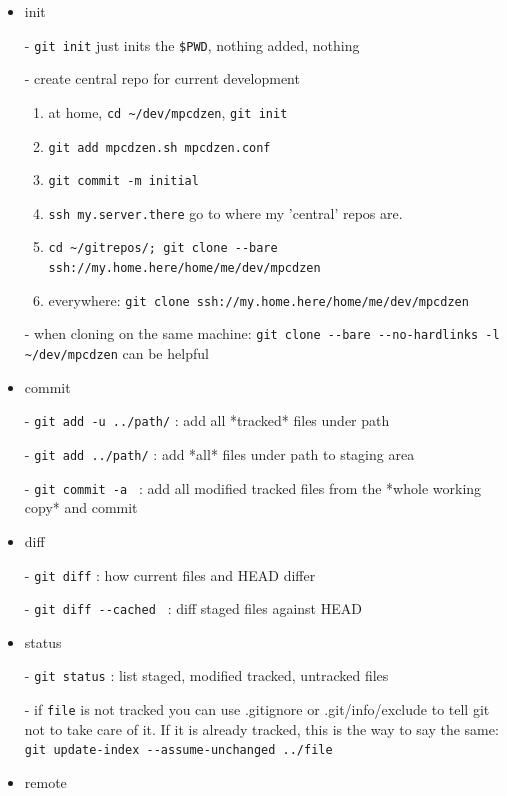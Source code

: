 \begin{itemize}


\item{init} 

- \verb`git init`  just inits the \verb`$PWD`, nothing added, nothing

- create central repo for current development\begin{enumerate}
	
	\item at home, \verb`cd ~/dev/mpcdzen`, \verb`git init`
	\item \verb`git add mpcdzen.sh mpcdzen.conf`  
	\item \verb`git commit -m initial`
	\item \verb`ssh my.server.there` go to where my 'central' repos are.
	\item \verb`cd ~/gitrepos/; git clone --bare  ssh://my.home.here/home/me/dev/mpcdzen`
	\item everywhere: \verb`git clone ssh://my.home.here/home/me/dev/mpcdzen` \end{enumerate}

- when cloning on the same machine:
  \verb`git clone --bare --no-hardlinks -l ~/dev/mpcdzen`  can be helpful



\item{commit}

- \verb`git add -u ../path/` : add all *tracked* files under path

- \verb`git add ../path/` : add *all* files under path to staging area

- \verb`git commit -a ` : add all modified tracked files from the *whole
  working copy* and commit
  	

\item{diff}
  	
- \verb`git diff` : how current files and HEAD differ

- \verb`git diff --cached ` : diff staged files against HEAD


\item{status}

- \verb`git status` : list staged, modified tracked, untracked files

- if \verb`file` is not tracked you can use .gitignore or .git/info/exclude
  to tell git not to take care of it. If it is already tracked, this is
  the way to say the same: \verb`git update-index --assume-unchanged ../file`  

\item{remote}


\end{itemize}
